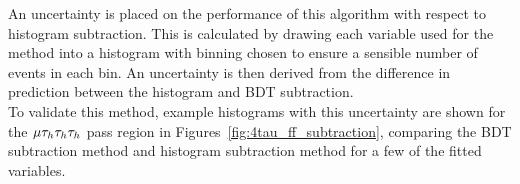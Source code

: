 An uncertainty is placed on the performance of this algorithm with respect to histogram subtraction.
This is calculated by drawing each variable used for the method into a histogram with binning chosen to ensure a sensible number of events in each bin.
An uncertainty is then derived from the difference in prediction between the histogram and BDT subtraction. \\

To validate this method, example histograms with this uncertainty are shown for the $\mu\tau_{h}\tau_{h}\tau_{h}$ pass region in Figures~\ref{fig:4tau_ff_subtraction}, comparing the BDT subtraction method and histogram subtraction method for a few of the fitted variables. \\

\begin{figure}[!hbtp]
\centering
     \\

\end{figure}
